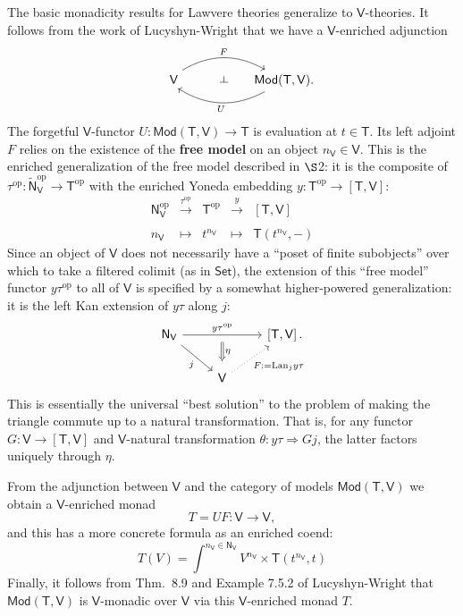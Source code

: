 \documentclass{amsart}
\theoremstyle{definition}
\def\ld{\rotatebox[origin=c]{-90}{$\dashv$}} %
\newcommand{\Set}{\mathsf{Set}}
\newcommand{\Mod}{\mathsf{Mod}}
\newcommand{\NN}{\mathsf{N}}
\newcommand{\V}{\mathsf{V}}
\newcommand{\T}{\mathsf{T}}
\newcommand{\op}{\mathrm{op}}
\newcommand{\maps}{\colon}
\begin{document}
The basic monadicity results for Lawvere theories generalize to $\V$-theories.
It follows from the work of Lucyshyn-Wright \cite[Sec.\ 8]{lucyshyn-wright} that we have a $\V$-enriched adjunction
\[\begin{tikzcd}[column sep=small]
\phantom{AA} \V \arrow[bend left,below]{rr}{F}
& {\phantom{Aa} \ld} &
\arrow[bend left,above]{ll}{U} \Mod(\T,\V).
\end{tikzcd}\]
The forgetful $\V$-functor $U \maps \Mod(\T,\V) \to \T$ is evaluation at $t \in \T$.   Its left
adjoint $F$ relies on the existence of the \textbf{free model} on an object $n_\V \in \V$.   This is the enriched generalization of the free model described in $\S$2: it is the composite of $\tau^\op\maps \tilde{\NN}_\V^\op \to \T^\op$ with the enriched Yoneda embedding $y\maps \T^\op \to [\T,\V]$:
\[\begin{array}{rllll}
\NN_\V^\op & \xrightarrow{\tau^\op} & \T^\op & \xrightarrow{y} & \left[\T,\V\right]\\
\\
n_\V & \mapsto & t^{n_\V} & \mapsto & \T(t^{n_\V},-)
\end{array}\]
Since an object of $\V$ does not necessarily have a ``poset of finite subobjects'' over which to take a filtered colimit (as in $\Set$), the extension of this ``free model'' functor $y \tau^\op$ to all of $\V$ is specified by a somewhat higher-powered generalization: it is the left Kan extension of $y\tau$ along $j$:
\[\begin{tikzcd}
\NN_\V \arrow[rr,"y\tau^\op"{name=y}] \arrow[swap,rd,"j"] & & \left[\T,\V\right].\\
& \V \arrow[swap,dotted, ru,"F:=\mathrm{Lan}_jy\tau"] \arrow[Rightarrow,from=y,"\eta", shorten >=0.2cm,shorten <=.2cm]
\end{tikzcd}\]
This is essentially the universal ``best solution'' to the problem of making the triangle commute up to a natural transformation.  That is, for any functor $G \maps \V \to [\T,\V]$ and $\V$-natural transformation $\theta \maps y\tau \Rightarrow Gj$, the latter factors uniquely through $\eta$.

From the adjunction between $\V$ and the category of models $\Mod(\T,\V)$ we obtain a $\V$-enriched monad
\[       T = U F \maps \V \to \V, \]
and this has a more concrete formula as an enriched coend:
\begin{equation}
T(V) = \int^{n_\V\in \NN_\V} V^{n_\V} \times \T(t^{n_\V},t)
\end{equation}
Finally, it follows from Thm.\ 8.9 and Example 7.5.2 of Lucyshyn-Wright \cite{lucyshyn-wright} that 
$\Mod(\T,\V)$ is $\V$-monadic over $\V$ via this $\V$-enriched monad $T$.
\end{document}

